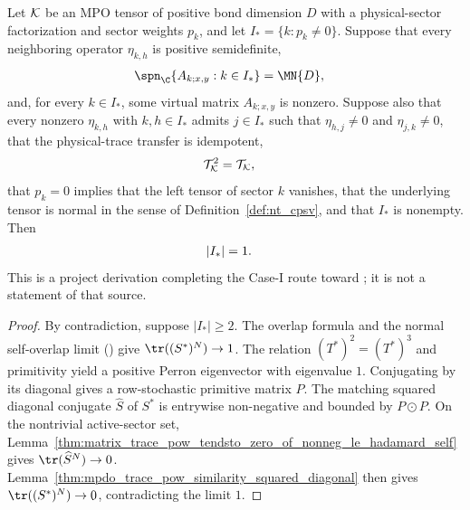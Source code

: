 \begin{lemma}
    \label{thm:mpdo_active_sector_singleton}
    \leanok
    Let ${\cal K}$ be an MPO tensor of positive bond dimension $D$ with a
    physical-sector factorization and sector weights $p_k$, and let
    $I_*=\{k:p_k\ne0\}$. Suppose that every neighboring operator
    $\eta_{k,h}$ is positive semidefinite,
    \begin{align}
        \spn_{\C}\{A_{k;x,y}:k\in I_*\} & =\MN{D},
        \notag
    \end{align}
    and, for every $k\in I_*$, some virtual matrix $A_{k;x,y}$ is nonzero.
    Suppose also that every nonzero $\eta_{k,h}$ with $k,h\in I_*$ admits
    $j\in I_*$ such that $\eta_{h,j}\ne0$ and $\eta_{j,k}\ne0$, that the
    physical-trace transfer is idempotent,
    \begin{align}
        \mathcal T_{\cal K}^2 & =\mathcal T_{\cal K},
        \notag
    \end{align}
    that $p_k=0$ implies that the left tensor of sector $k$ vanishes, that
    the underlying tensor is normal in the sense of
    Definition~\ref{def:nt_cpsv}, and that $I_*$ is nonempty. Then
    \begin{align}
        \left|I_*\right| & =1.
        \notag
    \end{align}
    This is a project derivation completing the Case-I route toward
    \cite[Appendix~C.2, Lemma~C.5, lines~1473--1499]{Cirac2016MPDO_arXiv};
    it is not a statement of that source.
\end{lemma}

\begin{proof}
    \leanok
    By contradiction, suppose $|I_*|\geq2$. The overlap formula and the
    normal self-overlap limit
    (\cite[lines~1080--1100]{Cirac2016MPDO_arXiv}) give
    $\tr((S^*)^N)\to1$. The relation $(T^*)^2=(T^*)^3$ and primitivity
    yield a positive Perron eigenvector with eigenvalue $1$. Conjugating
    by its diagonal gives a row-stochastic primitive matrix $P$. The
    matching squared diagonal conjugate $\widehat S$ of $S^*$ is
    entrywise non-negative and bounded by $P\odot P$. On the nontrivial
    active-sector set, Lemma~\ref{thm:matrix_trace_pow_tendsto_zero_of_nonneg_le_hadamard_self}
    gives $\tr(\widehat S^N)\to0$.
    Lemma~\ref{thm:mpdo_trace_pow_similarity_squared_diagonal} then gives
    $\tr((S^*)^N)\to0$, contradicting the limit $1$.
\end{proof}

